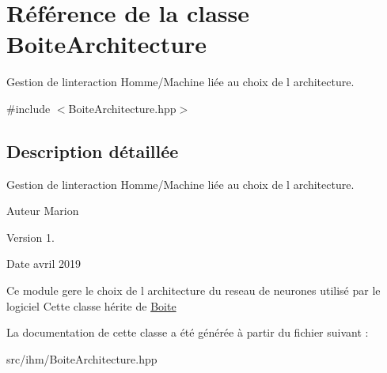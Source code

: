 \hypertarget{classBoiteArchitecture}{}\section{Référence de la classe Boite\+Architecture}
\label{classBoiteArchitecture}


Gestion de l\textquotesingle{}interaction Homme/\+Machine liée au choix de l architecture.  




{\ttfamily \#include $<$Boite\+Architecture.\+hpp$>$}



\subsection{Description détaillée}
Gestion de l\textquotesingle{}interaction Homme/\+Machine liée au choix de l architecture. 

\begin{DoxyAuthor}{Auteur}
Marion 
\end{DoxyAuthor}
\begin{DoxyVersion}{Version}
1. 
\end{DoxyVersion}
\begin{DoxyDate}{Date}
avril 2019
\end{DoxyDate}
Ce module gere le choix de l architecture du reseau de neurones utilisé par le logiciel Cette classe hérite de \hyperlink{classBoite}{Boite} 

La documentation de cette classe a été générée à partir du fichier suivant \+:\begin{DoxyCompactItemize}
\item 
src/ihm/Boite\+Architecture.\+hpp\end{DoxyCompactItemize}
